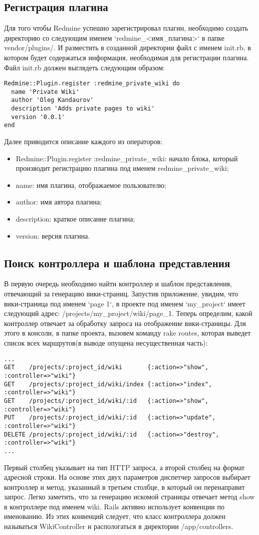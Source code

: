 \subsection{Регистрация плагина}
Для того чтобы Redmine успешно зарегистрировал плагин, необходимо создать
директорию со следующим именем `redmine\_<имя\_плагина>` в папке
vendor/plugins/. И разместить в созданной директории файл с именем init.rb, в
котором будет содержаться информация, необходимая для регистрации плагина. Файл
init.rb должен выглядеть следующим образом:
\lstset{language=Ruby}
\begin{lstlisting}
Redmine::Plugin.register :redmine_private_wiki do
  name 'Private Wiki'
  author 'Oleg Kandaurov'
  description 'Adds private pages to wiki'
  version '0.0.1'
end
\end{lstlisting}
Далее приводится описание каждого из операторов:
\begin{itemize}
  \item Redmine::Plugin.register :redmine\_private\_wiki: начало блока,
  который производит регистрацию плагина под именем redmine\_private\_wiki;
  \item name: имя плагина, отображаемое пользователю;
  \item author: имя автора плагина;
  \item description: краткое описание плагина;
  \item version: версия плагина.
\end{itemize}

\subsection{Поиск контроллера и шаблона представления}
В первую очередь необходимо найти контроллер и шаблон представления, отвечающий
за генерацию вики-страниц. Запустив приложение, увидим, что вики-страница под
именем `page 1`, в проекте под именем `my\_project` имеет следующий адрес:
/projects/my\_project/wiki/page\_1. Теперь определим, какой контроллер
отвечает за обработку запроса на отображение вики-страницы. Для этого
в консоли, в папке проекта, вызовем команду rake routes, которая выведет список
всех маршрутов(в выводе опущена несущественная часть):
\small{
\begin{lstlisting}
...
GET    /projects/:project_id/wiki       {:action=>"show", :controller=>"wiki"}
GET    /projects/:project_id/wiki/index {:action=>"index", :controller=>"wiki"}
GET    /projects/:project_id/wiki/:id   {:action=>"show", :controller=>"wiki"}
PUT    /projects/:project_id/wiki/:id   {:action=>"update", :controller=>"wiki"} 
DELETE /projects/:project_id/wiki/:id   {:action=>"destroy", :controller=>"wiki"} 
...
\end{lstlisting}
}
Первый столбец указывает на тип HTTP запроса, а второй столбец на формат
адресной строки. На основе этих двух параметров диспетчер запросов выбирает
контроллер и метод, указанный в третьем столбце, в который он перенаправит
запрос. Легко заметить, что за генерацию искомой страницы отвечает метод show в
контроллере под именем wiki. Rails активно использует конвенции по
именованию. Из этих конвенций следует, что класс контроллера должен называться
WikiController и распологаться в директории /app/controllers.

